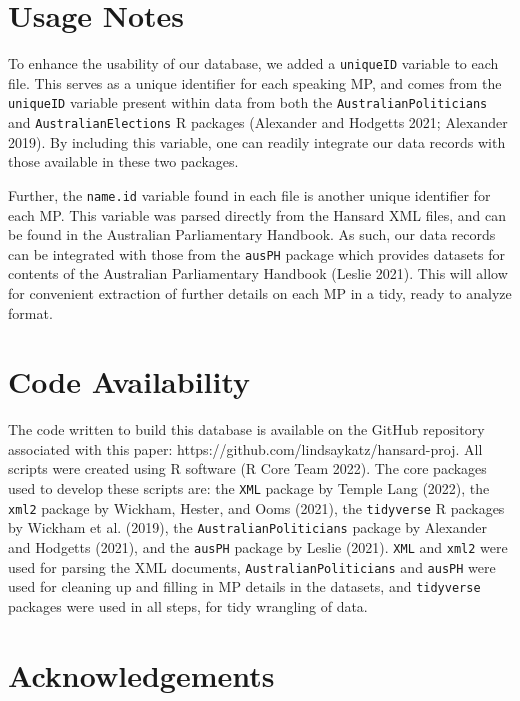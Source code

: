 \documentclass[
  letterpaper,
  DIV=11,
  numbers=noendperiod]{scrartcl}
\begin{document}
\hypertarget{sec-usage}{%
\section{Usage Notes}\label{sec-usage}}

To enhance the usability of our database, we added a \texttt{uniqueID}
variable to each file. This serves as a unique identifier for each
speaking MP, and comes from the \texttt{uniqueID} variable present
within data from both the \texttt{AustralianPoliticians} and
\texttt{AustralianElections} R packages (Alexander and Hodgetts 2021;
Alexander 2019). By including this variable, one can readily integrate
our data records with those available in these two packages.

Further, the \texttt{name.id} variable found in each file is another
unique identifier for each MP. This variable was parsed directly from
the Hansard XML files, and can be found in the Australian Parliamentary
Handbook. As such, our data records can be integrated with those from
the \texttt{ausPH} package which provides datasets for contents of the
Australian Parliamentary Handbook (Leslie 2021). This will allow for
convenient extraction of further details on each MP in a tidy, ready to
analyze format.

\hypertarget{code-availability}{%
\section{Code Availability}\label{code-availability}}

The code written to build this database is available on the GitHub
repository associated with this paper:
https://github.com/lindsaykatz/hansard-proj. All scripts were created
using R software (R Core Team 2022). The core packages used to develop
these scripts are: the \texttt{XML} package by Temple Lang (2022), the
\texttt{xml2} package by Wickham, Hester, and Ooms (2021), the
\texttt{tidyverse} R packages by Wickham et al. (2019), the
\texttt{AustralianPoliticians} package by Alexander and Hodgetts (2021),
and the \texttt{ausPH} package by Leslie (2021). \texttt{XML} and
\texttt{xml2} were used for parsing the XML documents,
\texttt{AustralianPoliticians} and \texttt{ausPH} were used for cleaning
up and filling in MP details in the datasets, and \texttt{tidyverse}
packages were used in all steps, for tidy wrangling of data.

\hypertarget{acknowledgements}{%
\section{Acknowledgements}\label{acknowledgements}}
\end{document}
